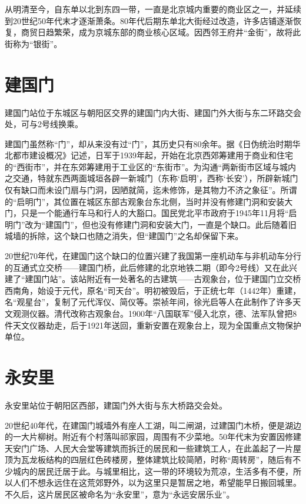 从明清至今，自东单以北到东四一带，一直是北京城内重要的商业区之一，并延续到20世纪50年代末才逐渐萧条。80年代后期东单北大街经过改造，许多店铺逐渐恢复，商贸日趋繁荣，成为京城东部的商业核心区域。因西邻王府井“金街”，故将此街称为“银街”。

\section{建国门}
建国门站位于东城区与朝阳区交界的建国门内大街、建国门外大街与东二环路交会处，可与2号线换乘。

建国门虽然称“门”，却从来没有过“门”，其历史只有80余年。据《日伪统治时期华北都市建设概况》记述，日军于1939年起，开始在北京西郊筹建用于商业和住宅的“西街市”，并在东郊筹建用于工业区的“东街市”。为沟通“两新街市区域与城内之交通，特就东西两面城垣各辟一新城门（东称‘启明’，西称‘长安’），所辟新城门仅有缺口而未设门扇与门洞，因陋就简，迄未修饰，是其物力不济之象征”。所谓的“启明门”，其位置在城区东部古观象台东北侧，当时并没有修建门洞和安装大门，只是一个能通行车马和行人的大豁口。国民党北平市政府于1945年11月将“启明门”改为“建国门”，但也没有修建门洞和安装大门，一直是个缺口。此后随着旧城墙的拆除，这个缺口也随之消失，但“建国门”之名却保留下来。

20世纪70年代，在建国门这个缺口的位置兴建了我国第一座机动车与非机动车分行的互通式立交桥——建国门桥，此后修建的北京地铁二期（即今2号线）又在此兴建了“建国门站”。该站附近有一处著名的古建筑——古观象台，位于建国门立交桥西南角，始设于元代，原名“司天台”。明初被毁后，于正统七年（1442年）重建，名“观星台”，复制了元代浑仪、简仪等。崇祯年间，徐光启等人在此制作了许多天文观测仪器。清代改称古观象台。1900年“八国联军”侵入北京，德、法军队曾把8件天文仪器劫走，后于1921年送回，重新安置在观象台上，现为全国重点文物保护单位。

\section{永安里}
永安里站位于朝阳区西部，建国门外大街与东大桥路交会处。

20世纪40年代，在建国门城墙外有座人工湖，叫二闸湖，过建国门木桥，便是湖边的一大片柳树。附近有个村落叫祁家园，周围有不少菜地。50年代末为安置因修建天安门广场、人民大会堂等建筑而拆迁的居民和一些建筑工人，在此盖起了一片屋顶为瓦龙板结构的四层红色砖楼房，整体建筑比较简陋，时称“周转房”，随后有不少城内的居民迁居于此。与城里相比，这一带的环境较为荒凉，生活多有不便，所以人们不想永远住在这荒郊野外，以为这里只是暂居之地，希望能早日搬回城里。不久后，这片居民区被命名为“永安里”，意为“永远安居乐业”。

